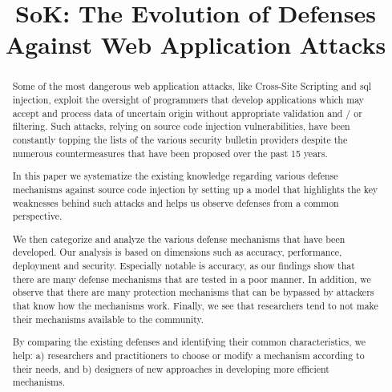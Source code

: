 \documentclass[conference]{IEEEtran}
\date{}
\begin{document}
\author{
}

\title{SoK: The Evolution of Defenses Against Web Application Attacks}

\maketitle
\begin{abstract}

  Some of the most dangerous web application attacks, like Cross-Site
  Scripting and {\sc sql} injection, exploit the oversight of
  programmers that develop applications which may accept and process
  data of uncertain origin without appropriate validation and / or
  filtering. Such attacks, relying on source code injection
  vulnerabilities, have been constantly topping the lists of the
  various security bulletin providers despite the numerous
  countermeasures that have been proposed over the past 15 years.

  In this paper we systematize the existing knowledge regarding
  various defense mechanisms against source code injection by setting
  up a model that highlights the key weaknesses behind such attacks and
  helps us observe defenses from a common perspective.

  We then categorize and analyze the various defense mechanisms that
  have been developed. Our analysis is based on dimensions such as
  accuracy, performance, deployment and security. Especially notable
  is accuracy, as our findings show that there are
  many defense mechanisms that are tested in a poor manner.
  In addition, we observe that there are many protection mechanisms
  that can be bypassed by attackers that know how the mechanisms
  work. Finally, we see that researchers tend to not make
  their mechanisms available to the community.

  By comparing the existing defenses and identifying their common
  characteristics, we help: a) researchers and practitioners to choose
  or modify a mechanism according to their needs, and b) designers of
  new approaches in developing more efficient mechanisms.


\end{abstract}
\end{document}
